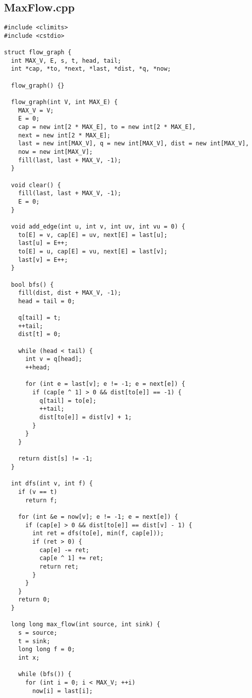 \documentclass[10pt]{article}
\begin{document}
\begin{multicols*}{3}
\begin{lstlisting}
\end{lstlisting}
\subsection*{MaxFlow.cpp}
\nopagebreak[4]
\begin{lstlisting}
#include <climits>
#include <cstdio>

struct flow_graph {
  int MAX_V, E, s, t, head, tail;
  int *cap, *to, *next, *last, *dist, *q, *now;

  flow_graph() {}

  flow_graph(int V, int MAX_E) {
    MAX_V = V;
    E = 0;
    cap = new int[2 * MAX_E], to = new int[2 * MAX_E],
    next = new int[2 * MAX_E];
    last = new int[MAX_V], q = new int[MAX_V], dist = new int[MAX_V],
    now = new int[MAX_V];
    fill(last, last + MAX_V, -1);
  }

  void clear() {
    fill(last, last + MAX_V, -1);
    E = 0;
  }

  void add_edge(int u, int v, int uv, int vu = 0) {
    to[E] = v, cap[E] = uv, next[E] = last[u];
    last[u] = E++;
    to[E] = u, cap[E] = vu, next[E] = last[v];
    last[v] = E++;
  }

  bool bfs() {
    fill(dist, dist + MAX_V, -1);
    head = tail = 0;

    q[tail] = t;
    ++tail;
    dist[t] = 0;

    while (head < tail) {
      int v = q[head];
      ++head;

      for (int e = last[v]; e != -1; e = next[e]) {
        if (cap[e ^ 1] > 0 && dist[to[e]] == -1) {
          q[tail] = to[e];
          ++tail;
          dist[to[e]] = dist[v] + 1;
        }
      }
    }

    return dist[s] != -1;
  }

  int dfs(int v, int f) {
    if (v == t)
      return f;

    for (int &e = now[v]; e != -1; e = next[e]) {
      if (cap[e] > 0 && dist[to[e]] == dist[v] - 1) {
        int ret = dfs(to[e], min(f, cap[e]));
        if (ret > 0) {
          cap[e] -= ret;
          cap[e ^ 1] += ret;
          return ret;
        }
      }
    }
    return 0;
  }

  long long max_flow(int source, int sink) {
    s = source;
    t = sink;
    long long f = 0;
    int x;

    while (bfs()) {
      for (int i = 0; i < MAX_V; ++i)
        now[i] = last[i];


\end{lstlisting}
\end{multicols*}
\end{document}
